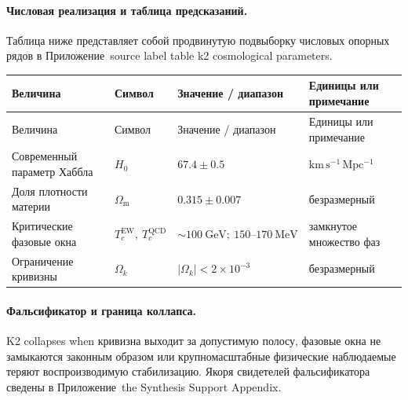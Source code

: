 \paragraph{Числовая реализация и таблица предсказаний.}
Таблица ниже представляет собой продвинутую подвыборку числовых опорных рядов в Приложение~source label table k2 cosmological parameters.
\begin{longtable}{@{}L{0.27\textwidth}L{0.15\textwidth}L{0.24\textwidth}L{0.16\textwidth}@{}}
\toprule
Величина & Символ & Значение / диапазон & Единицы или примечание \\
\midrule
\endfirsthead
\toprule
Величина & Символ & Значение / диапазон & Единицы или примечание \\
\midrule
\endhead
Современный параметр Хаббла & $\scriptstyle H_0$ & $67.4 \pm 0.5$ & $\mathrm{km\,s^{-1}\,Mpc^{-1}}$ \\
Доля плотности материи & $\scriptstyle \Omega_{\mathrm{m}}$ & $0.315 \pm 0.007$ & безразмерный \\
Критические фазовые окна & $\scriptstyle T_c^{\mathrm{EW}},\allowbreak \ T_c^{\mathrm{QCD}}$ & $\sim 100\ \mathrm{GeV};\allowbreak \ 150\text{--}170\ \mathrm{MeV}$ & замкнутое множество фаз \\
Ограничение кривизны & $\scriptstyle \Omega_k$ & $|\Omega_k| < 2 \times 10^{-3}$ & безразмерный \\
\bottomrule
\end{longtable}

\paragraph{Фальсификатор и граница коллапса.}
K2 collapses when кривизна выходит за допустимую полосу, фазовые окна не замыкаются законным образом или крупномасштабные физические наблюдаемые теряют воспроизводимую стабилизацию.
Якоря свидетелей фальсификатора сведены в Приложение~the Synthesis Support Appendix.

